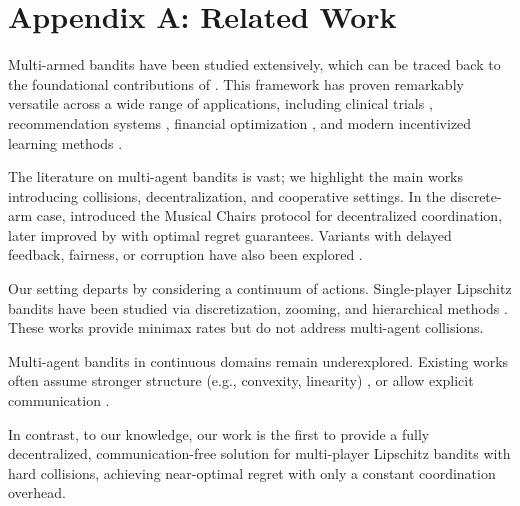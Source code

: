 \section*{Appendix A: Related Work}
\label{app:rel-work}

Multi-armed bandits \citep{slivkins2019introduction,lattimore2020bandit} have been studied extensively, which can be traced back to the foundational contributions of \citep{thompson1933likelihood,lai1985asymptotically}. This framework has proven remarkably versatile across a wide range of applications, including clinical trials \citep{gittins1}, recommendation systems \citep{Li_2010}, financial optimization \citep{brochu}, and modern incentivized learning methods \citep{fraz,wang,chakraborty2024incentivized,chakraborty2025incentivized}.

The literature on multi-agent bandits is vast; we highlight the main works introducing collisions, decentralization, and cooperative settings. In the discrete-arm case, \citep{rosenski2016multi} introduced the Musical Chairs protocol for decentralized coordination, later improved by \citep{wang2020optimal} with optimal regret guarantees. Variants with delayed feedback, fairness, or corruption have also been explored \citep{boursier2020survey,ghaffari2024robust}.

Our setting departs by considering a continuum of actions. Single-player Lipschitz bandits have been studied via discretization, zooming, and hierarchical methods \citep{magureanu2014lipschitz,bubeck2011xarmed,Kleinberg}. These works provide minimax rates but do not address multi-agent collisions.

Multi-agent bandits in continuous domains remain underexplored. Existing works often assume stronger structure (e.g., convexity, linearity) \citep{bambos}, or allow explicit communication \citep{landgren2020distributed}.

In contrast, to our knowledge, our work is the first to provide a fully decentralized, communication-free solution for multi-player Lipschitz bandits with hard collisions, achieving near-optimal regret with only a constant coordination overhead.
